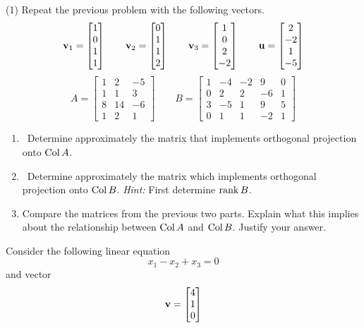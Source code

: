 \begin{tasks}[resume, style=enumerate](1)
\task
  Repeat the previous problem with the following vectors.
  \begin{displaymath}
    \mathbf v_1 =  \begin{bmatrix} 1 \\ 0 \\ 1 \\ 1 \end{bmatrix} 
    \qquad
    \mathbf v_2 =  \begin{bmatrix} 0 \\ 1 \\ 1 \\ 2 \end{bmatrix} 
    \qquad
    \mathbf v_3 =  \begin{bmatrix} 1 \\ 0 \\ 2 \\ -2 \end{bmatrix} 
    \qquad
    \mathbf u =  \begin{bmatrix} 2 \\ -2 \\ 1 \\ -5 \end{bmatrix} 
  \end{displaymath}
\task
  \begin{displaymath}
    A =
    \begin{bmatrix}
      1 & 2 & -5 \\
      1 & 1 & 3 \\
      8 & 14 & -6 \\
      1 & 2 & 1
    \end{bmatrix}
    \qquad
    B =
    \begin{bmatrix}
      1 & -4 & -2 & 9 & 0 \\
      0 & 2 & 2 & -6 & 1 \\
      3 & -5 & 1 & 9 & 5 \\
      0 & 1 & 1 & -2 & 1
    \end{bmatrix}
  \end{displaymath}
  \begin{enumerate}[label=(\alph*)]
  \item
    \faCalculator \ Determine approximately the matrix that implements
    orthogonal projection onto $\operatorname{\mathrm{Col}} A$.
  \item
    \faCalculator \ Determine approximately the matrix which
    implements orthogonal projection onto $\operatorname{\mathrm{Col}} B$.  \textit{Hint:}
    First determine $\operatorname{\mathrm{rank}} B$.
  \item
    Compare the matrices from the previous two parts.  Explain what
    this implies about the relationship between $\operatorname{\mathrm{Col}} A$ and $\operatorname{\mathrm{Col}} B$.
    Justify your answer.
  \end{enumerate}
\task
  Consider the following linear equation
  \begin{displaymath}
    x_1 - x_2 + x_3 = 0
  \end{displaymath}
  and vector
  \begin{displaymath}
    \mathbf v =  \begin{bmatrix} 4 \\ 1 \\ 0 \end{bmatrix} 
  \end{displaymath}


\end{tasks}
